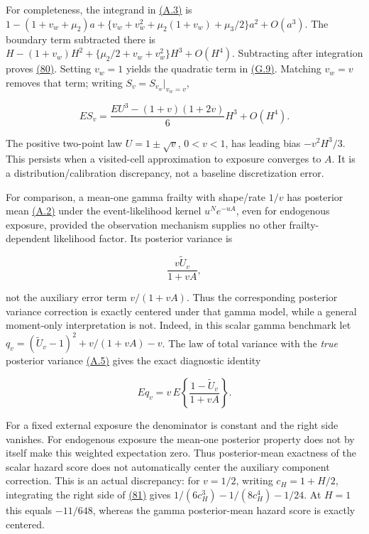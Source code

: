 \documentclass[11pt]{article}
\begin{document}
For completeness, the integrand in \hyperref[eq:A.3]{(A.3)} is
\(1-(1+v_w+\mu_2)a+
\{v_w+v_w^2+\mu_2(1+v_w)+\mu_3/2\}a^2+O(a^3)\).
The boundary term subtracted there is
\(H-(1+v_w)H^2+\{\mu_2/2+v_w+v_w^2\}H^3+O(H^4)\).
Subtracting after integration proves \hyperref[eq:80]{(80)}. Setting \(v_w=1\) yields the quadratic term in \hyperref[eq:G.9]{(G.9)}. Matching \(v_w=v\) removes that term; writing \(S_v=S_{v_w}|_{v_w=v}\),

\begin{equation*}
ES_v=\frac{EU^3-(1+v)(1+2v)}6H^3+O(H^4).
\tag{A.4}\label{eq:A.4}
\end{equation*}

The positive two-point law \(U=1\pm\sqrt v\), \(0<v<1\), has leading bias \(-v^2H^3/3\). This persists when a visited-cell approximation to exposure converges to \(A\). It is a distribution/calibration discrepancy, not a baseline discretization error.

For comparison, a mean-one gamma frailty with shape/rate \(1/v\) has posterior mean \hyperref[eq:A.2]{(A.2)} under the event-likelihood kernel \(u^Ne^{-uA}\), even for endogenous exposure, provided the observation mechanism supplies no other frailty-dependent likelihood factor. Its posterior variance is

\begin{equation*}
\frac{v\widetilde U_v}{1+vA},
\tag{A.5}\label{eq:A.5}
\end{equation*}

not the auxiliary error term \(v/(1+vA)\). Thus the corresponding posterior variance correction is exactly centered under that gamma model, while a general moment-only interpretation is not. Indeed, in this scalar gamma benchmark let \(q_v=(\widetilde U_v-1)^2+v/(1+vA)-v\). The law of total variance with the \emph{true} posterior variance \hyperref[eq:A.5]{(A.5)} gives the exact diagnostic identity

\begin{equation*}
E q_v=v\,E\left\{\frac{1-\widetilde U_v}{1+vA}\right\}.
\tag{81}\label{eq:81}
\end{equation*}

For a fixed external exposure the denominator is constant and the right side vanishes. For endogenous exposure the mean-one posterior property does not by itself make this weighted expectation zero. Thus posterior-mean exactness of the scalar hazard score does not automatically center the auxiliary component correction. This is an actual discrepancy: for \(v=1/2\), writing \(c_H=1+H/2\), integrating the right side of \hyperref[eq:81]{(81)} gives \(1/(6c_H^3)-1/(8c_H^4)-1/24\). At \(H=1\) this equals \(-11/648\), whereas the gamma posterior-mean hazard score is exactly centered.
\end{document}
